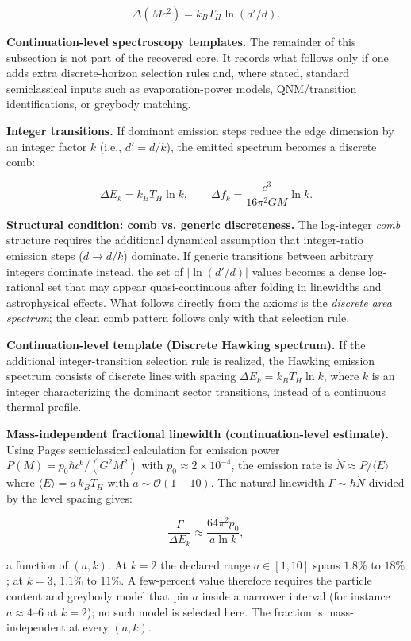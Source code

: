 \[
\Delta(Mc^2) = k_B T_H \ln(d'/d).
\]

\textbf{Continuation-level spectroscopy templates.} The remainder of this subsection is not part of the recovered core. It records what follows only if one adds extra discrete-horizon selection rules and, where stated, standard semiclassical inputs such as evaporation-power models, QNM/transition identifications, or greybody matching.

\textbf{Integer transitions.} If dominant emission steps reduce the edge dimension by an integer factor \(k\) (i.e., \(d'=d/k\)), the emitted spectrum becomes a discrete comb:

\[
\Delta E_k = k_B T_H \ln k, \qquad
\Delta f_k = \frac{c^3}{16\pi^2 G M} \ln k.
\]

\textbf{Structural condition: comb vs. generic discreteness.} The log-integer \emph{comb} structure requires the additional dynamical assumption that integer-ratio emission steps (\(d \to d/k\)) dominate. If generic transitions between arbitrary integers dominate instead, the set of \(|\ln(d'/d)|\) values becomes a dense log-rational set that may appear quasi-continuous after folding in linewidths and astrophysical effects. What follows directly from the axioms is the \emph{discrete area spectrum}; the clean comb pattern follows only with that selection rule.

\textbf{Continuation-level template (Discrete Hawking spectrum).} If the additional integer-transition selection rule is realized, the Hawking emission spectrum consists of discrete lines with spacing \(\Delta E_k = k_B T_H \ln k\), where \(k\) is an integer characterizing the dominant sector transitions, instead of a continuous thermal profile.

\textbf{Mass-independent fractional linewidth (continuation-level estimate).} Using Page\textquotesingle s semiclassical calculation for emission power \(P(M) = p_0 \hbar c^6 / (G^2 M^2)\) with \(p_0 \approx 2 \times 10^{-4}\), the emission rate is \(\dot{N} \approx P /
\langle E \rangle\) where \(\langle E \rangle = a \, k_B T_H\) with \(a \sim
\mathcal{O}(1-10)\). The natural linewidth \(\Gamma \sim \hbar \dot{N}\) divided by the level spacing gives:

\[
\frac{\Gamma}{\Delta E_k} \approx \frac{64\pi^2 p_0}{a \ln k},
\]

a function of \((a,k)\). At \(k=2\) the declared range \(a\in[1,10]\) spans \(1.8\%\) to \(18\%\); at \(k=3\), \(1.1\%\) to \(11\%\). A few-percent value therefore requires the particle content and greybody model that pin \(a\) inside a narrower interval (for instance \(a\approx4\)--\(6\) at \(k=2\)); no such model is selected here. The fraction is mass-independent at every \((a,k)\).

